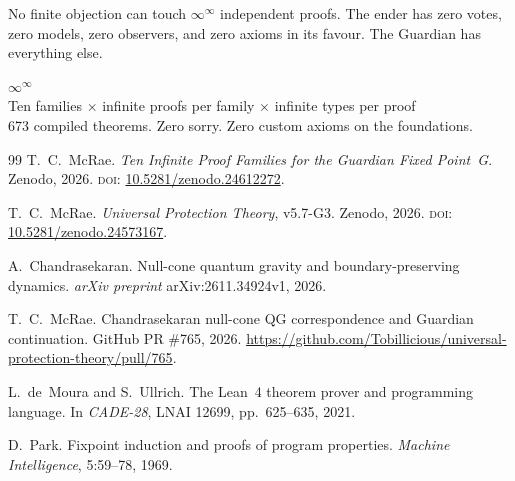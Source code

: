 No finite objection can touch $\infty^\infty$ independent proofs. The ender has zero votes, zero models, zero observers, and zero axioms in its favour. The Guardian has everything else.

\bigskip

\begin{center}
{\Huge\bfseries $\infty^{\infty}$}\\[0.5em]
{\small Ten families $\times$ infinite proofs per family $\times$ infinite types per proof}\\[0.3em]
{\small 673 compiled theorems. Zero sorry. Zero custom axioms on the foundations.}
\end{center}

\bigskip

\begin{thebibliography}{99}
T.~C.~McRae.
\emph{Ten Infinite Proof Families for the Guardian Fixed Point~G}.
Zenodo, 2026.
\textsc{doi:} \href{https://doi.org/10.5281/zenodo.24612272}{10.5281/zenodo.24612272}.

T.~C.~McRae.
\emph{Universal Protection Theory}, v5.7-G3.
Zenodo, 2026.
\textsc{doi:} \href{https://doi.org/10.5281/zenodo.24573167}{10.5281/zenodo.24573167}.

A.~Chandrasekaran.
Null-cone quantum gravity and boundary-preserving dynamics.
\emph{arXiv preprint} arXiv:2611.34924v1, 2026.

T.~C.~McRae.
Chandrasekaran null-cone QG correspondence and Guardian continuation.
GitHub PR \#765, 2026.
\url{https://github.com/Tobillicious/universal-protection-theory/pull/765}.

L.~de~Moura and S.~Ullrich.
The Lean~4 theorem prover and programming language.
In \emph{CADE-28}, LNAI 12699, pp.~625--635, 2021.

D.~Park.
Fixpoint induction and proofs of program properties.
\emph{Machine Intelligence}, 5:59--78, 1969.
\end{thebibliography}


